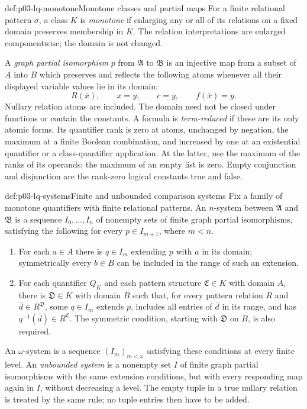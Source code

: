 \begin{hbdefinition}{def:p03-lq-monotone}{Monotone classes and partial maps}
For a finite relational pattern \(\sigma\), a class \(K\) is
\emph{monotone} if enlarging any or all of its relations on a fixed
domain preserves membership in \(K\). The relation interpretations
are enlarged componentwise; the domain is not changed.

A \emph{graph partial isomorphism} \(p\) from \(\mathfrak A\) to
\(\mathfrak B\) is an injective map from a subset of \(A\) into \(B\)
which preserves and reflects the following atoms whenever all their
displayed variable values lie in its domain:
\[
 R(\bar x),\qquad x=y,\qquad c=y,\qquad f(\bar x)=y.
\]
Nullary relation atoms are included. The domain need not be closed
under functions or contain the constants. A formula is
\emph{term-reduced} if these are its only atomic forms.
Its quantifier rank is zero at atoms, unchanged by negation, the
maximum at a finite Boolean combination, and increased by one at
an existential quantifier or a class-quantifier application.
At the latter, use the maximum of the ranks of its operands;
the maximum of an empty list is zero. Empty conjunction and disjunction
are the rank-zero logical constants true and false.
\end{hbdefinition}

\begin{hbdefinition}{def:p03-lq-systems}{Finite and unbounded comparison systems}
Fix a family of monotone quantifiers with finite relational patterns.
An \(n\)-system between \(\mathfrak A\) and \(\mathfrak B\) is a
sequence \(I_0,\ldots,I_n\) of nonempty sets of finite graph partial
isomorphisms, satisfying the following for every \(p\in I_{m+1}\),
where \(m<n\).
\begin{enumerate}
 \item For each \(a\in A\) there is \(q\in I_m\) extending \(p\)
       with \(a\) in its domain; symmetrically every \(b\in B\)
       can be included in the range of such an extension.
 \item For each quantifier \(Q_K\) and each pattern structure
       \(\mathfrak C\in K\) with domain \(A\), there is
       \(\mathfrak D\in K\) with domain \(B\) such that, for every
       pattern relation \(R\) and \(\bar d\in R^{\mathfrak D}\),
       some \(q\in I_m\) extends \(p\), includes all entries of
       \(\bar d\) in its range, and has
       \(q^{-1}(\bar d)\in R^{\mathfrak C}\).
       The symmetric condition, starting with \(\mathfrak D\) on
       \(B\), is also required.
\end{enumerate}
An \(\omega\)-system is a sequence \((I_m)_{m<\omega}\) satisfying
these conditions at every finite level. An \emph{unbounded system}
is a nonempty set \(I\) of finite graph partial isomorphisms with
the same extension conditions, but with every responding map again
in \(I\), without decreasing a level.
The empty tuple in a true nullary relation is treated by the same
rule; no tuple entries then have to be added.
\end{hbdefinition}

